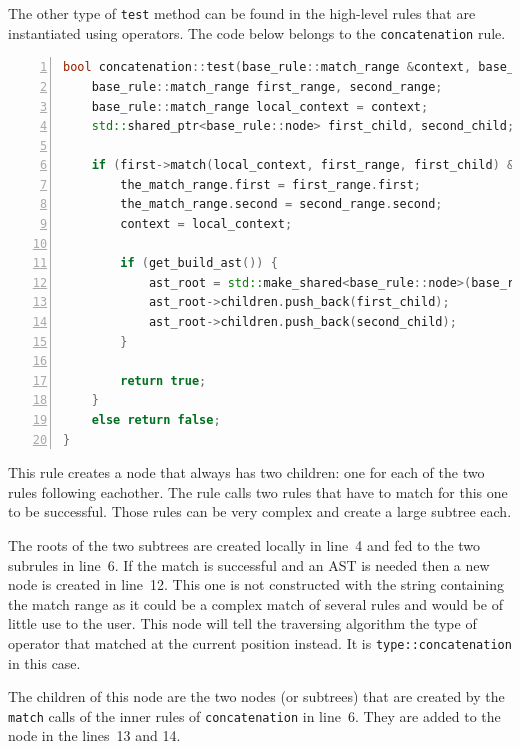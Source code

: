 \documentclass[12pt]{article}
\begin{document}
The other type of \texttt{test} method can be found in the high-level rules that are instantiated using
operators. The code below belongs to the \texttt{concatenation} rule.

\begin{center}
	\begin{minipage}[ht]{0.95\textwidth}
		\begin{lstlisting}[language=C++, breaklines=true, numbers=left]
bool concatenation::test(base_rule::match_range &context, base_rule::match_range &the_match_range, std::shared_ptr<base_rule::node> &ast_root) {
	base_rule::match_range first_range, second_range;
	base_rule::match_range local_context = context;
	std::shared_ptr<base_rule::node> first_child, second_child;

	if (first->match(local_context, first_range, first_child) && second->match(local_context, second_range, second_child)) {
		the_match_range.first = first_range.first;
		the_match_range.second = second_range.second;
		context = local_context;

		if (get_build_ast()) {
			ast_root = std::make_shared<base_rule::node>(base_rule::node::type::concatenation);
			ast_root->children.push_back(first_child);
			ast_root->children.push_back(second_child);
		}

		return true;
	}
	else return false;
}
		\end{lstlisting}
	\end{minipage}
\end{center}

This rule creates a node that always has two children: one for each of the two rules following eachother. The
rule calls two rules that have to match for this one to be successful. Those rules can be very complex and
create a large subtree each.

The roots of the two subtrees are created locally in line~4 and fed to the two subrules in line~6. If the
match is successful and an AST is needed then a new node is created in line~12. This one is not constructed
with the string containing the match range as it could be a complex match of several rules and would be of
little use to the user. This node will tell the traversing algorithm the type of operator that matched at the
current position instead. It is \texttt{type::concatenation} in this case.

The children of this node are the two nodes (or subtrees) that are created by the \texttt{match} calls of the
inner rules of \texttt{concatenation} in line~6. They are added to the node in the lines~13 and 14.
\end{document}
